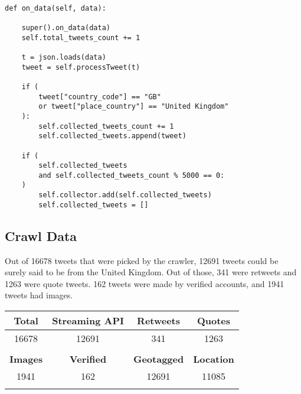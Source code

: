 \documentclass{article}
\begin{document}
\begin{verbatim}

def on_data(self, data):

    super().on_data(data)
    self.total_tweets_count += 1

    t = json.loads(data)
    tweet = self.processTweet(t)

    if (
        tweet["country_code"] == "GB"
        or tweet["place_country"] == "United Kingdom"
    ):
        self.collected_tweets_count += 1
        self.collected_tweets.append(tweet)

    if (
        self.collected_tweets
        and self.collected_tweets_count % 5000 == 0:
    )
        self.collector.add(self.collected_tweets)
        self.collected_tweets = []

\end{verbatim}

\subsection{Crawl Data}

Out of 16678 tweets that were picked by the crawler, 12691 tweets could be surely said to be from the United Kingdom. Out of those, 341 were retweets and 1263 were quote tweets. 162 tweets were made by verified accounts, and 1941 tweets had images.

\begin{table}[htb]
\centering
\begin{tabular}{|c|c|c|c|}
\hline
\textbf{Total}  & \textbf{Streaming API} & \textbf{Retweets}  & \textbf{Quotes}   \\ \hline
16678           & 12691                  & 341                & 1263              \\
                &                        &                    &                   \\ \hline
\textbf{Images} & \textbf{Verified}      & \textbf{Geotagged} & \textbf{Location} \\ \hline
1941            & 162                    & 12691              & 11085             \\
                &                        &                    &                   \\ \hline
\end{tabular}
\end{table}


\end{document}
